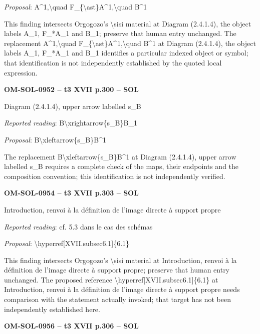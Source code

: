 \emph{Proposal}: A\textasciicircum{}1,\textbackslash{}quad F\_\{\textbackslash{}ast\}A\textasciicircum{}1,\textbackslash{}quad B\textasciicircum{}1\par
This finding intersects Orgogozo's \textbackslash{}sisi material at Diagram (2.4.1.4), the object labels A\_1, F\_*A\_1 and B\_1; preserve that human entry unchanged. The replacement A\textasciicircum{}1,\textbackslash{}quad F\_\{\textbackslash{}ast\}A\textasciicircum{}1,\textbackslash{}quad B\textasciicircum{}1 at Diagram (2.4.1.4), the object labels A\_1, F\_*A\_1 and B\_1 identifies a particular indexed object or symbol; that identification is not independently established by the quoted local expression.\par
\par\noindent\textbf{OM-SOL-0952 -- t3 XVII p.300 -- SOL}\par
Diagram (2.4.1.4), upper arrow labelled s\_B\par
\emph{Reported reading}: B\textbackslash{}xrightarrow\{s\_B\}B\_1\par
\emph{Proposal}: B\textbackslash{}xleftarrow\{s\_B\}B\textasciicircum{}1\par
The replacement B\textbackslash{}xleftarrow\{s\_B\}B\textasciicircum{}1 at Diagram (2.4.1.4), upper arrow labelled s\_B requires a complete check of the maps, their endpoints and the composition convention; this identification is not independently verified.\par
\par\noindent\textbf{OM-SOL-0954 -- t3 XVII p.303 -- SOL}\par
Introduction, renvoi à la définition de l'image directe à support propre\par
\emph{Reported reading}: cf. 5.3 dans le cas des schémas\par
\emph{Proposal}: \textbackslash{}hyperref[XVII.subsec6.1]\{6.1\}\par
This finding intersects Orgogozo's \textbackslash{}sisi material at Introduction, renvoi à la définition de l'image directe à support propre; preserve that human entry unchanged. The proposed reference \textbackslash{}hyperref[XVII.subsec6.1]\{6.1\} at Introduction, renvoi à la définition de l'image directe à support propre needs comparison with the statement actually invoked; that target has not been independently established here.\par
\par\noindent\textbf{OM-SOL-0956 -- t3 XVII p.306 -- SOL}\par
